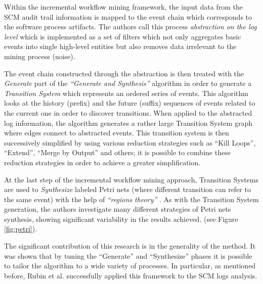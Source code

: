 Within the incremental workflow mining framework, the input data from the SCM
audit trail information is mapped to the event chain which corresponds to the
software process artifacts. The authors call this process \textit{abstraction on
the log level} which is implemented as a set of filters which not only
aggregates basic events into single high-level entities but also removes data
irrelevant to the mining process (noise). 

The event chain constructed through the abstraction is then treated with the
\textit{Generate} part of the \textit{``Generate and Synthesis''}
\cite{citeulike:3718014} algorithm in order to generate a \textit{Transition
System} which represents an ordered series of events. This algorithm looks at
the history (prefix) and the future (suffix) sequences of events related to the
current one in order to discover transitions.  When applied to the abstracted
log information, the algorithm generates a rather large Transition System graph
where edges connect to abstracted events. This transition system is then
successively simplified by using various reduction strategies such as ``Kill
Loops'', ``Extend'', ``Merge by Output'' and others; it is possible to combine
these reduction strategies in order to achieve a greater simplification.

At the last step of the incremental workflow mining approach, Transition Systems
are used to \textit{Synthesize} labeled Petri nets (where different transition
can refer to the same event) with the help of \textit{``regions theory''}
\cite{citeulike:5128170}. As with the Transition System generation, the authors
investigate many different strategies of Petri nets synthesis, showing
significant variability in the results achieved. (see Figure \ref{fig:petri}).

The significant contribution of this research is in the generality of the
method. It was shown that by tuning the ``Generate'' and ``Synthesize'' phases
it is possible to tailor the algorithm to a wide variety of processes. In
particular, as mentioned before, Rubin et al. successfully applied this
framework to the SCM logs analysis.